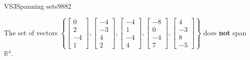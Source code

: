 \begin{exercise}{VS3}{Spanning sets}{9882}
\begin{exerciseAnswer}
 

 The set of vectors \(\left\{ \left[\begin{array}{c}
0 \\
2 \\
-4 \\
1
\end{array}\right] , \left[\begin{array}{c}
-4 \\
-3 \\
4 \\
2
\end{array}\right] , \left[\begin{array}{c}
-4 \\
1 \\
-4 \\
4
\end{array}\right] , \left[\begin{array}{c}
-8 \\
0 \\
-4 \\
7
\end{array}\right] , \left[\begin{array}{c}
4 \\
-3 \\
8 \\
-5
\end{array}\right] \right\}\) does \textbf{not} span \(\mathbb{R}^4\). 

 \end{exerciseAnswer}
 \end{exercise}


